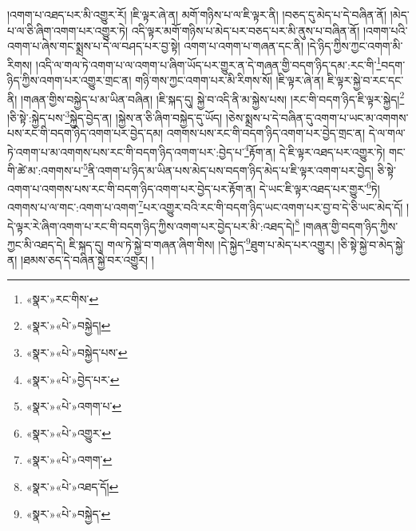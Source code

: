 །འགག་པ་འཐད་པར་མི་འགྱུར་རོ། །ཇི་ལྟར་ཞེ་ན། མགོ་གཉིས་པ་ལ་ཇི་ལྟར་ནི། །བཅད་དུ་མེད་པ་དེ་བཞིན་ནོ། །མེད་པ་ལ་ཅི་ཞིག་འགག་པར་འགྱུར་ཏེ། འདི་ལྟར་མགོ་གཉིས་པ་མེད་པར་བཅད་པར་མི་ནུས་པ་བཞིན་ནོ། །འགག་པའི་འགག་པ་ཞེས་གང་སྨྲས་པ་དེ་ལ་བཤད་པར་བྱ་སྟེ། འགག་པ་འགག་པ་གཞན་དང་ནི། །དེ་ཉིད་ཀྱིས་ཀྱང་འགག་མི་རིགས། །འདི་ལ་གལ་ཏེ་འགག་པ་ལ་འགག་པ་ཞིག་ཡོད་པར་གྱུར་ན་དེ་གཞན་གྱི་བདག་ཉིད་དམ་:རང་གི་\footnote{«སྣར་»རང་གིས་}བདག་ཉིད་ཀྱིས་འགག་པར་འགྱུར་གྲང་ན། གཉི་གས་ཀྱང་འགག་པར་མི་རིགས་སོ། །ཇི་ལྟར་ཞེ་ན། ཇི་ལྟར་སྐྱེ་བ་རང་དང་ནི། །གཞན་གྱིས་བསྐྱེད་པ་མ་ཡིན་བཞིན། །ཇི་སྐད་དུ། སྐྱེ་བ་འདི་ནི་མ་སྐྱེས་པས། །རང་གི་བདག་ཉིད་ཇི་ལྟར་སྐྱེད།\footnote{«སྣར་»«པེ་»བསྐྱེད།} །ཅི་སྟེ་:སྐྱེད་པས་\footnote{«སྣར་»«པེ་»བསྐྱེད་པས་}སྐྱེད་བྱེད་ན། །སྐྱེས་ན་ཅི་ཞིག་བསྐྱེད་དུ་ཡོད། །ཅེས་སྨྲས་པ་དེ་བཞིན་དུ་འགག་པ་ཡང་མ་འགགས་པས་རང་གི་བདག་ཉིད་འགག་པར་བྱེད་དམ། འགགས་པས་རང་གི་བདག་ཉིད་འགག་པར་བྱེད་གྲང་ན། དེ་ལ་གལ་ཏེ་འགག་པ་མ་འགགས་པས་རང་གི་བདག་ཉིད་འགག་པར་:བྱེད་པ་\footnote{«སྣར་»«པེ་»བྱེད་པར་}རྟོག་ན། དེ་ཇི་ལྟར་འཐད་པར་འགྱུར་ཏེ། གང་གི་ཚེ་མ་:འགགས་པ་\footnote{«སྣར་»«པེ་»འགག་པ་}ནི་འགག་པ་ཉིད་མ་ཡིན་པས་མེད་པས་བདག་ཉིད་མེད་པ་ཇི་ལྟར་འགག་པར་བྱེད། ཅི་སྟེ་འགག་པ་འགགས་པས་རང་གི་བདག་ཉིད་འགག་པར་བྱེད་པར་རྟོག་ན། དེ་ཡང་ཇི་ལྟར་འཐད་པར་གྱུར་\footnote{«སྣར་»«པེ་»འགྱུར་}ཏེ། འགགས་པ་ལ་གང་:འགག་པ་འགག་\footnote{«སྣར་»«པེ་»འགག་}པར་འགྱུར་བའི་རང་གི་བདག་ཉིད་ཡང་འགག་པར་བྱ་བ་དེ་ཅི་ཡང་མེད་དོ། །དེ་ལྟར་རེ་ཞིག་འགག་པ་རང་གི་བདག་ཉིད་ཀྱིས་འགག་པར་བྱེད་པར་མི་:འཐད་དེ།\footnote{«སྣར་»«པེ་»འཐད་དོ།} །གཞན་གྱི་བདག་ཉིད་ཀྱིས་ཀྱང་མི་འཐད་དེ། ཇི་སྐད་དུ། གལ་ཏེ་སྐྱེ་བ་གཞན་ཞིག་གིས། །དེ་སྐྱེད་\footnote{«སྣར་»«པེ་»བསྐྱེད་}ཐུག་པ་མེད་པར་འགྱུར། །ཅི་སྟེ་སྐྱེ་བ་མེད་སྐྱེ་ན། །ཐམས་ཅད་དེ་བཞིན་སྐྱེ་བར་འགྱུར། །
